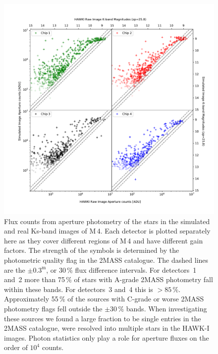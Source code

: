 \begin{figure}

    \centering
    \includegraphics[width=\textwidth]{images/HAWKI_vs_HAWKado_counts}
    
    \caption{Flux counts from aperture photometry of the stars in the simulated and real Ks-band images of M\,4.
    Each detector is plotted separately here as they cover different regions of M\,4 and have different gain factors.
    The strength of the symbols is determined by the photometric quality flag in the 2MASS catalogue.
    The dashed lines are the $\pm 0.3^\mathrm{m}$, or 30\,\% flux difference intervals.
    For detectors~1 and~2  more than 75\,\% of stars with A-grade 2MASS photometry fall within these bands.
    For detectors~3 and~4 this is $>85\,\%$.
    Approximately 55\,\% of the sources with C-grade or worse 2MASS photometry flags fell outside the $\pm 30\,\%$ bands.
    When investigating these sources we found a large fraction to be single entries in the 2MASS catalogue, were resolved into multiple stars in the HAWK-I images. 
    Photon statistics only play a role for aperture fluxes on the order of $10^{4}$ counts.}
    \label{fig:HAWKI_hawkado_flux_comparison}
    
\end{figure}

